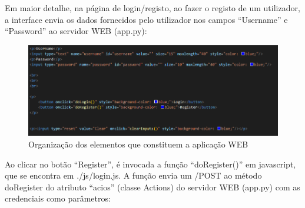 \documentclass{report}
\begin{document}
\linebreak
\bigskip

Em maior detalhe, na página de login/registo, ao fazer o registo de um utilizador, a interface envia os dados fornecidos pelo utilizador nos campos “Username” e “Password” ao servidor WEB (app.py):


\begin{figure}[!hbtp]

        \includegraphics[scale=0.60]{Images_code/4 - html index.png}
        \caption{\label{Estrutura}Organização dos elementos que constituem a aplicação WEB}
\end{figure}

\newpage

Ao clicar no botão “Register”, é invocada a função “doRegister()” em javascript, que se encontra em ./js/login.js. A função envia um /POST ao método doRegister do atributo “acios” (classe Actions) do servidor WEB (app.py) com as credenciais como parâmetros:
\end{document}
